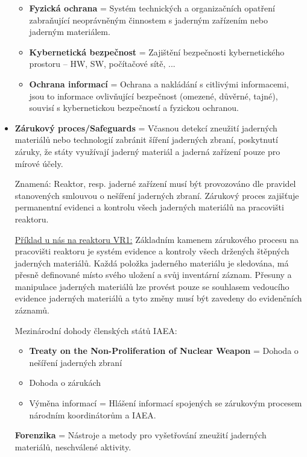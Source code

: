 \begin{itemize}
    \begin{itemize}
        \item \textbf{Fyzická ochrana} = Systém technických a organizačních opatření zabraňující neoprávněným činnostem s jaderným zařízením nebo jaderným materiálem.
        \item \textbf{Kybernetická bezpečnost} = Zajištění bezpečnosti kybernetického prostoru -- HW, SW, počítačové sítě, ...\item \textbf{Ochrana informací} = Ochrana a nakládání s citlivými informacemi, jsou to informace ovlivňující bezpečnost (omezené, důvěrné, tajné), souvisí s kybernetickou bezpečností a fyzickou ochranou.
    \end{itemize}
    
    \item \textbf{Zárukový proces/Safeguards} = Včasnou detekcí zneužití jaderných materiálů nebo technologií zabránit šíření jaderných zbraní, poskytnutí záruky, že státy využívají jaderný materiál a jaderná zařízení pouze pro mírové účely.

    Znamená: Reaktor, resp. jaderné zařízení musí být provozováno dle pravidel stanovených smlouvou o nešíření jaderných zbraní. Zárukový proces zajišťuje permanentní evidenci a kontrolu všech jaderných materiálů na pracovišti reaktoru.

    \underline{Příklad u nás na reaktoru VR1:} Základním kamenem zárukového procesu na pracovišti reaktoru je systém evidence a kontroly všech držených štěpných jaderných materiálů. Každá položka jaderného materiálu je sledována, má přesně definované místo svého uložení a svůj inventární záznam. Přesuny a manipulace jaderných materiálů lze provést pouze se souhlasem vedoucího evidence jaderných materiálů a tyto změny musí být zavedeny do evidenčních záznamů.

    Mezinárodní dohody členských států IAEA:

    \begin{itemize}
        \item \textbf{Treaty on the Non-Proliferation of Nuclear Weapon} = Dohoda o nešíření jaderných zbraní
        \item Dohoda o zárukách
        \item Výměna informací = Hlášení informací spojených se zárukovým procesem národním koordinátorům a IAEA.
    \end{itemize}

    \textbf{Forenzika} = Nástroje a metody pro vyšetřování zneužití jaderných materiálů, neschválené aktivity.

\end{itemize}


